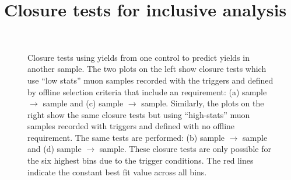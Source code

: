 \newpage
\section{Closure tests for inclusive analysis\label{app:closure-incl}}

\begin{figure}[!h]
  \begin{center}
     \\
    \caption{Closure tests using yields from one control to predict
      yields in another sample. The two plots on the left show closure
      tests which use ``low stats'' muon samples recorded with the
      \htalphat triggers and defined by offline selection criteria
      that include an \alt requirement: (a) \mj sample
      $\rightarrow$ \mmj sample and (c) \gj sample $\rightarrow$ \mmj
      sample. Similarly, the plots on the right show the same closure
      tests but using ``high-stats'' muon samples recorded with \muht
      triggers and defined with no offline \alt requirement. The
      same tests are performed: (b) \mj sample $\rightarrow$ \mmj
      sample and (d) \gj sample $\rightarrow$ \mmj sample. These
      closure tests are only possible for the six highest \HT bins
      due to the trigger conditions. The red lines indicate the
      constant best fit value across all \HT bins.}
    \label{fig:closure-with-alphat2}
  \end{center}
\end{figure}

